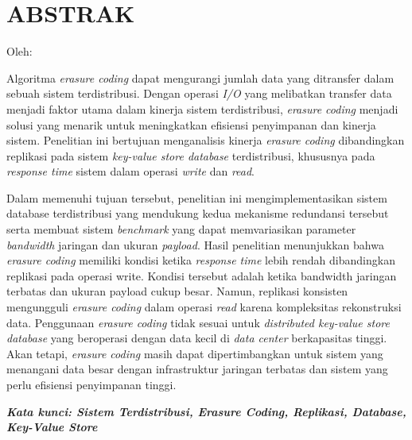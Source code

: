 \clearpage
\chapter*{ABSTRAK}

\begin{center}
  \center
  \begin{singlespace}
    \large\bfseries\MakeUppercase{\thetitle}
    
    \normalfont\normalsize
    Oleh:
    
    \bfseries \theauthor
  \end{singlespace}
\end{center}

\begin{singlespace}
  \small
  Algoritma \textit{erasure coding} dapat mengurangi jumlah data yang ditransfer dalam sebuah sistem terdistribusi. Dengan operasi \textit{I/O} yang melibatkan transfer data menjadi faktor utama dalam kinerja sistem terdistribusi, \textit{erasure coding} menjadi solusi yang menarik untuk meningkatkan efisiensi penyimpanan dan kinerja sistem. Penelitian ini bertujuan menganalisis kinerja \textit{erasure coding} dibandingkan replikasi pada sistem \textit{key-value store database} terdistribusi, khususnya pada \textit{response time} sistem dalam operasi \textit{write} dan \textit{read}.
  
  Dalam memenuhi tujuan tersebut, penelitian ini mengimplementasikan sistem database terdistribusi yang mendukung kedua mekanisme redundansi tersebut serta membuat sistem \textit{benchmark} yang dapat memvariasikan parameter \textit{bandwidth} jaringan dan ukuran \textit{payload}. Hasil penelitian menunjukkan bahwa \textit{erasure coding} memiliki kondisi ketika \textit{response time} lebih rendah dibandingkan replikasi pada operasi write. Kondisi tersebut adalah ketika bandwidth jaringan terbatas dan ukuran payload cukup besar. Namun, replikasi konsisten mengungguli \textit{erasure coding} dalam operasi \textit{read} karena kompleksitas rekonstruksi data. Penggunaan \textit{erasure coding} tidak sesuai untuk \textit{distributed key-value store database} yang beroperasi dengan data kecil di \textit{data center} berkapasitas tinggi. Akan tetapi, \textit{erasure coding} masih dapat dipertimbangkan untuk sistem yang menangani data besar dengan infrastruktur jaringan terbatas dan sistem yang perlu efisiensi penyimpanan tinggi.
  
  \textbf{\textit{Kata kunci: Sistem Terdistribusi, Erasure Coding, Replikasi, Database, Key-Value Store }}
  
\end{singlespace}
\clearpage